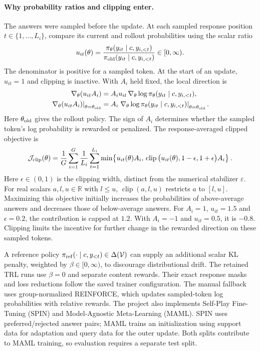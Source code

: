 \paragraph{Why probability ratios and clipping enter.}
The answers were sampled before the update. At each sampled response position $t\in\{1,\ldots,L_i\}$, compare its current and rollout probabilities using the scalar ratio
\begin{equation}
\label{eq:grpo-ratio}
 u_{it}(\theta)=
 \frac{\pi_\theta(y_{it}\mid c,y_{i,<t})}
      {\pi_{\rm old}(y_{it}\mid c,y_{i,<t})}\in[0,\infty).
\end{equation}
The denominator is positive for a sampled token. At the start of an update, $u_{it}=1$ and clipping is inactive. With $A_i$ held fixed, the local direction is
\begin{align}
 \nabla_\theta(u_{it}A_i)
   &= A_i u_{it}\,\nabla_\theta\log\pi_\theta(y_{it}\mid c,y_{i,<t}),
       \label{eq:grpo-token-gradient}\\
 \left.\nabla_\theta(u_{it}A_i)\right|_{\theta=\theta_{\rm old}}
   &= A_i\left.\nabla_\theta\log\pi_\theta(y_{it}\mid c,y_{i,<t})
            \right|_{\theta=\theta_{\rm old}}.
       \label{eq:grpo-rollout-gradient}
\end{align}
Here $\theta_{\rm old}$ gives the rollout policy. The sign of $A_i$ determines whether the sampled token's log probability is rewarded or penalized. The response-averaged clipped objective is
\begin{equation}
\label{eq:grpo-objective}
 \mathcal J_{\rm clip}(\theta)=
 \frac1G\sum_{i=1}^G\frac1{L_i}\sum_{t=1}^{L_i}
 \min\!\left\{u_{it}(\theta)A_i,\,
  \operatorname{clip}\big(u_{it}(\theta),1-\epsilon,1+\epsilon\big)A_i\right\}.
\end{equation}
Here $\epsilon\in(0,1)$ is the clipping width, distinct from the numerical stabilizer $\varepsilon$. For real scalars $a,l,u\in\mathbb R$ with $l\leq u$, $\operatorname{clip}(a,l,u)$ restricts $a$ to $[l,u]$. Maximizing this objective initially increases the probabilities of above-average answers and decreases those of below-average answers. For $A_i=1$, $u_{it}=1.5$ and $\epsilon=0.2$, the contribution is capped at $1.2$. With $A_i=-1$ and $u_{it}=0.5$, it is $-0.8$. Clipping limits the incentive for further change in the rewarded direction on these sampled tokens.

A reference policy $\pi_{\rm ref}(\cdot\mid c,y_{<t})\in\Delta(\mathcal V)$ can supply an additional scalar KL penalty, weighted by $\beta\in[0,\infty)$, to discourage distributional drift. The retained TRL runs use $\beta=0$ and separate content rewards. Their exact response masks and loss reductions follow the saved trainer configuration. The manual fallback uses group-normalized REINFORCE, which updates sampled-token log probabilities with relative rewards. The project also implements Self-Play Fine-Tuning (SPIN) and Model-Agnostic Meta-Learning (MAML). SPIN uses preferred/rejected answer pairs; MAML trains an initialization using support data for adaptation and query data for the outer update. Both splits contribute to MAML training, so evaluation requires a separate test split.
